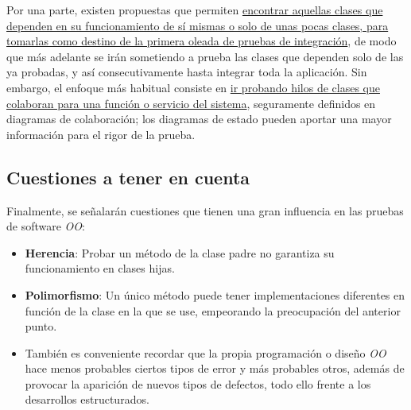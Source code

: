 Por una parte, existen propuestas que permiten \uline{encontrar aquellas clases que dependen en su funcionamiento de sí mismas o solo de unas pocas clases, para tomarlas como destino de la primera oleada de pruebas de integración}, de modo que más adelante se irán sometiendo a prueba las clases que dependen solo de las ya probadas, y así consecutivamente hasta integrar toda la aplicación. Sin embargo, el enfoque más habitual consiste en \uline{ir probando hilos de clases que colaboran para una función o servicio del sistema}, seguramente definidos en diagramas de colaboración; los diagramas de estado pueden aportar una mayor información para el rigor de la prueba.

\subsection{Cuestiones a tener en cuenta}

Finalmente, se señalarán cuestiones que tienen una gran influencia en las pruebas de software \textit{OO}:

\begin{itemize}
    \item \textbf{Herencia}: Probar un método de la clase padre no garantiza su funcionamiento en clases hijas.
    \item \textbf{Polimorfismo}: Un único método puede tener implementaciones diferentes en función de la clase en la que se use, empeorando la preocupación del anterior punto.
    \item También es conveniente recordar que la propia programación o diseño \textit{OO} hace menos probables ciertos tipos de error y más probables otros, además de provocar la aparición de nuevos tipos de defectos, todo ello frente a los desarrollos estructurados.
\end{itemize}
